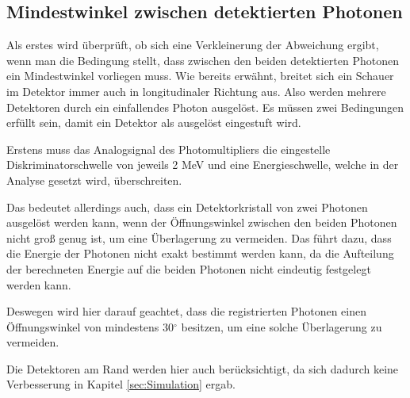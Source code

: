 \documentclass[a4paper,11pt,oneside,final,german,openbib,pdftex]{scrbook}
\begin{document}
{%

\subsection{Mindestwinkel zwischen detektierten Photonen}
\label{sec:Min-Openingangle}

Als erstes wird \"uberpr\"uft, ob sich eine Verkleinerung der Abweichung ergibt, wenn man die Bedingung stellt, dass zwischen den beiden detektierten Photonen ein Mindestwinkel vorliegen muss. 
Wie bereits erw\"ahnt, breitet sich ein Schauer im Detektor immer auch in longitudinaler Richtung aus. Also werden mehrere Detektoren durch ein einfallendes Photon ausgel\"ost. 
Es m\"ussen zwei Bedingungen erf\"ullt sein, damit ein Detektor als ausgel\"ost eingestuft wird.

Erstens muss das Analogsignal des Photomultipliers die eingestelle Diskriminatorschwelle von jeweils 2 MeV und eine Energieschwelle, welche in der Analyse gesetzt wird, \"uberschreiten.


 

Das bedeutet allerdings auch, dass ein Detektorkristall von zwei Photonen ausgel\"ost werden kann, wenn der \"Offnungswinkel zwischen den beiden Photonen nicht gro{\ss} genug ist, um eine \"Uberlagerung zu vermeiden. Das f\"uhrt dazu, dass die Energie der Photonen nicht exakt bestimmt werden kann, da die Aufteilung der berechneten Energie auf die beiden Photonen nicht eindeutig festgelegt werden kann.

Deswegen wird hier darauf geachtet, dass die registrierten Photonen einen \"Offnungswinkel von mindestens 30$^{\circ}$ besitzen, um eine solche \"Uberlagerung zu vermeiden.

Die Detektoren am Rand werden hier auch ber\"ucksichtigt, da sich dadurch keine Verbesserung in Kapitel \ref{sec:Simulation} ergab.

}
\end{document}
